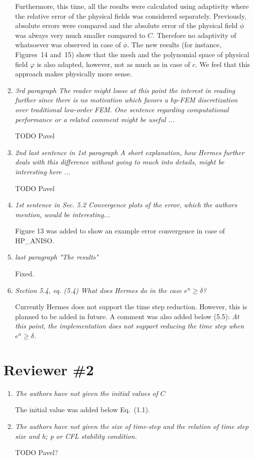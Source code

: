 \documentclass[mathpazo]{cicp}
\begin{document}
\begin{enumerate}
Furthermore, this time, all the results were calculated using adaptivity where the relative error
of the physical fields was considered separately.  Previously, absolute errors were compared
and the absolute error of the physical field $\phi$ was always very  much smaller compared to
$C$. Therefore no adaptivity of whatsoever was observed in case of $\phi$. The new results
(for instance, Figures~14 and~15) show that the mesh and the polynomial
space of physical field $\varphi$ is also adapted, however, not as much as in case of $c$.
We feel that this approach makes physically more sense.

\item \emph{3rd paragraph The reader might loose at this point the interest in reading further since there
is no motivation which favors a hp-FEM discretization over traditional low-order FEM. One
sentence regarding computational performance or a related comment might be useful ...}

TODO Pavel

\item \emph{2nd last sentence in 1st paragraph A short explanation, how Hermes further deals with this
difference without going to much into details, might be interesting here ...}

TODO Pavel

\item \emph{1st sentence in Sec. 5.2 Convergence plots of the error, which the authors mention, would be interesting...}

Figure 13 was added to show an example error convergence in case of HP\_ANISO.

\item \emph{last paragraph "The results"}

Fixed.

\item \emph{Section 5.4, eq. (5.4) What does Hermes do in the case $e^n\geq\delta$?}

Currently Hermes does not support the time step reduction. However, this is planned to be added
in future. A comment was also added below (5.5): \emph{At this point,
the implementation does not support reducing the time step when $e^n \geq \delta$.}

\end{enumerate}

\section{Reviewer \#2}

\begin{enumerate}

\item \emph{The authors have not given the initial values of $C$}

The initial value was added below Eq.~(1.1).

\item \emph{The authors have not given the size of time-step and the relation
of time step size and h; p or CFL stability condition.}

TODO Pavel?

\end{enumerate}
\end{document}
